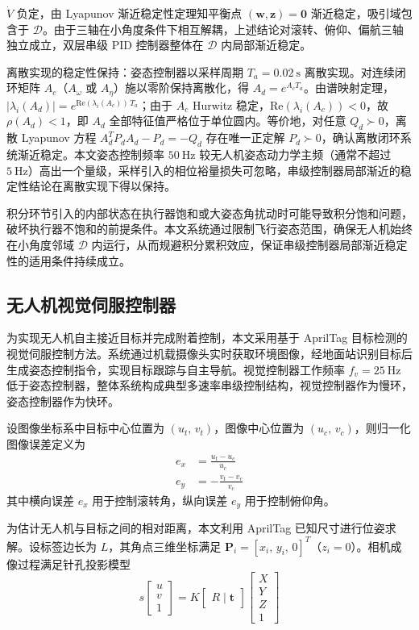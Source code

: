 $\dot{V}$ 负定，由 Lyapunov 渐近稳定性定理知平衡点 $(\mathbf{w},\mathbf{z}) = \mathbf{0}$ 渐近稳定，吸引域包含于 $\mathcal{D}$。由于三轴在小角度条件下相互解耦，上述结论对滚转、俯仰、偏航三轴独立成立，双层串级 PID 控制器整体在 $\mathcal{D}$ 内局部渐近稳定。

离散实现的稳定性保持：姿态控制器以采样周期 $T_a = 0.02\ \mathrm{s}$ 离散实现。对连续闭环矩阵 $A_c$（$A_\omega$ 或 $A_\eta$）施以零阶保持离散化，得 $A_d = e^{A_c T_a}$。由谱映射定理，$|\lambda_i(A_d)| = e^{\mathrm{Re}(\lambda_i(A_c))\,T_a}$；由于 $A_c$ Hurwitz 稳定，$\mathrm{Re}(\lambda_i(A_c)) < 0$，故 $\rho(A_d) < 1$，即 $A_d$ 全部特征值严格位于单位圆内。等价地，对任意 $Q_d \succ 0$，离散 Lyapunov 方程 $A_d^T P_d A_d - P_d = -Q_d$ 存在唯一正定解 $P_d \succ 0$，确认离散闭环系统渐近稳定。本文姿态控制频率 $50\ \mathrm{Hz}$ 较无人机姿态动力学主频（通常不超过 $5\ \mathrm{Hz}$）高出一个量级，采样引入的相位裕量损失可忽略，串级控制器局部渐近的稳定性结论在离散实现下得以保持。

积分环节引入的内部状态在执行器饱和或大姿态角扰动时可能导致积分饱和问题，破坏执行器不饱和的前提条件。本文系统通过限制飞行姿态范围，确保无人机始终在小角度邻域 $\mathcal{D}$ 内运行，从而规避积分累积效应，保证串级控制器局部渐近稳定性的适用条件持续成立。

\subsection{无人机视觉伺服控制器}

为实现无人机自主接近目标并完成附着控制，本文采用基于 AprilTag 目标检测的视觉伺服控制方法。系统通过机载摄像头实时获取环境图像，经地面站识别目标后生成姿态控制指令，实现目标跟踪与自主导航。视觉控制器工作频率 $f_v = 25\ \mathrm{Hz}$ 低于姿态控制器，整体系统构成典型多速率串级控制结构，视觉控制器作为慢环，姿态控制器作为快环。

设图像坐标系中目标中心位置为 $(u_t,\,v_t)$，图像中心位置为 $(u_c,\,v_c)$，则归一化图像误差定义为
\begin{align}
    e_x &=  \frac{u_t - u_c}{u_c} \\[4pt]
    e_y &= -\frac{v_t - v_c}{v_c}
\end{align}
其中横向误差 $e_x$ 用于控制滚转角，纵向误差 $e_y$ 用于控制俯仰角。

为估计无人机与目标之间的相对距离，本文利用 AprilTag 已知尺寸进行位姿求解。设标签边长为 $L$，其角点三维坐标满足 $\mathbf{P}_i = [x_i,\,y_i,\,0]^T$（$z_i = 0$）。相机成像过程满足针孔投影模型
\begin{equation}
    s
    \begin{bmatrix}u\\v\\1\end{bmatrix}
    = K\begin{bmatrix}R \mid \mathbf{t}\end{bmatrix}
    \begin{bmatrix}X\\Y\\Z\\1\end{bmatrix}
\end{equation}

